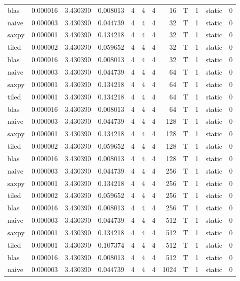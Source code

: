 \documentclass[
  12pt,
  xcolor = usenames,dvipsnames]{article}
\begin{document}
\begin{table}[!h]
{\begin{tabular}[t]{lrrrrrrrlrlr}
blas & 0.000016 & 3.430390 & 0.008013 & 4 & 4 & 4 & 16 & T & 1 & static & 0\\
naive & 0.000003 & 3.430390 & 0.044739 & 4 & 4 & 4 & 32 & T & 1 & static & 0\\
\addlinespace
saxpy & 0.000001 & 3.430390 & 0.134218 & 4 & 4 & 4 & 32 & T & 1 & static & 0\\
tiled & 0.000002 & 3.430390 & 0.059652 & 4 & 4 & 4 & 32 & T & 1 & static & 0\\
blas & 0.000016 & 3.430390 & 0.008013 & 4 & 4 & 4 & 32 & T & 1 & static & 0\\
naive & 0.000003 & 3.430390 & 0.044739 & 4 & 4 & 4 & 64 & T & 1 & static & 0\\
saxpy & 0.000001 & 3.430390 & 0.134218 & 4 & 4 & 4 & 64 & T & 1 & static & 0\\
\addlinespace
tiled & 0.000001 & 3.430390 & 0.134218 & 4 & 4 & 4 & 64 & T & 1 & static & 0\\
blas & 0.000016 & 3.430390 & 0.008013 & 4 & 4 & 4 & 64 & T & 1 & static & 0\\
naive & 0.000003 & 3.430390 & 0.044739 & 4 & 4 & 4 & 128 & T & 1 & static & 0\\
saxpy & 0.000001 & 3.430390 & 0.134218 & 4 & 4 & 4 & 128 & T & 1 & static & 0\\
tiled & 0.000002 & 3.430390 & 0.059652 & 4 & 4 & 4 & 128 & T & 1 & static & 0\\
\addlinespace
blas & 0.000016 & 3.430390 & 0.008013 & 4 & 4 & 4 & 128 & T & 1 & static & 0\\
naive & 0.000003 & 3.430390 & 0.044739 & 4 & 4 & 4 & 256 & T & 1 & static & 0\\
saxpy & 0.000001 & 3.430390 & 0.134218 & 4 & 4 & 4 & 256 & T & 1 & static & 0\\
tiled & 0.000002 & 3.430390 & 0.059652 & 4 & 4 & 4 & 256 & T & 1 & static & 0\\
blas & 0.000016 & 3.430390 & 0.008013 & 4 & 4 & 4 & 256 & T & 1 & static & 0\\
\addlinespace
naive & 0.000003 & 3.430390 & 0.044739 & 4 & 4 & 4 & 512 & T & 1 & static & 0\\
saxpy & 0.000001 & 3.430390 & 0.134218 & 4 & 4 & 4 & 512 & T & 1 & static & 0\\
tiled & 0.000001 & 3.430390 & 0.107374 & 4 & 4 & 4 & 512 & T & 1 & static & 0\\
blas & 0.000016 & 3.430390 & 0.008013 & 4 & 4 & 4 & 512 & T & 1 & static & 0\\
naive & 0.000003 & 3.430390 & 0.044739 & 4 & 4 & 4 & 1024 & T & 1 & static & 0\\

\end{tabular}}
\end{table}
\end{document}
